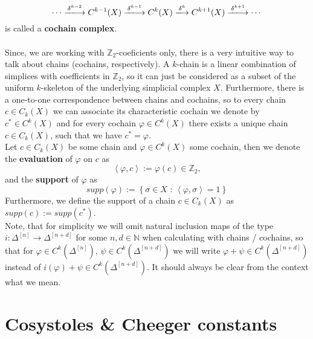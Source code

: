 \[
\cdots\xlongrightarrow{\delta^{k-2}} C^{k-1}(X)\xlongrightarrow{\delta^{k-1}} C^k(X)\xlongrightarrow{\delta^k} C^{k+1}(X)\xlongrightarrow{\delta^{k+1}}\cdots
\]
is called a \textbf{cochain complex}.\\
\\
Since, we are working with \(\mathbb{Z}_2\)-coeficients only, there is a very intuitive way to talk about chains (cochains, respectively). A \(k\)-chain is a linear combination of simplices with coefficients in \(\mathbb{Z}_2\), so it can just be considered as a subset of the uniform \(k\)-skeleton of the underlying simplicial complex \(X\). Furthermore, there is a one-to-one correspondence between chains and cochains, so to every chain \(c\in C_k(X)\) we can associate its characteristic cochain we denote by \(c^*\in C^k(X)\) and for every cochain \(\varphi\in C^k(X)\) there exists a unique chain \(c\in C_k(X)\), such that we have \(c^*=\varphi\).\\
Let \(c\in C_k(X)\) be some chain and \(\varphi\in C^k(X)\) some cochain, then we denote the \textbf{evaluation} of \(\varphi\) on \(c\) as
\[
\left\langle\varphi,c\right\rangle:=\varphi(c)\in\mathbb{Z}_2,
\]
and the \textbf{support} of \(\varphi\) as
\[
supp(\varphi):=\left\{\sigma\in X\text{ : }\left\langle\varphi,\sigma\right\rangle=1\right\}
\]
Furthermore, we define the support of a chain \(c\in C_k(X)\) as \(supp(c):=supp(c^*)\).\\
Note, that for simplicity we will omit natural inclusion maps of the type\\
\(i:\Delta^{[n]}\longrightarrow\Delta^{[n+d]}\) for some \(n,d\in\mathbb{N}\) when calculating with chains / cochains, so that for \(\varphi\in C^k(\Delta^{[n]})\text{, }\psi\in C^k(\Delta^{[n+d]})\) we will write \(\varphi+\psi\in C^k(\Delta^{[n+d]})\) instead of \(i(\varphi)+\psi\in C^k(\Delta^{[n+d]})\). It should always be clear from the context what we mean.
\section{Cosystoles \& Cheeger constants}

